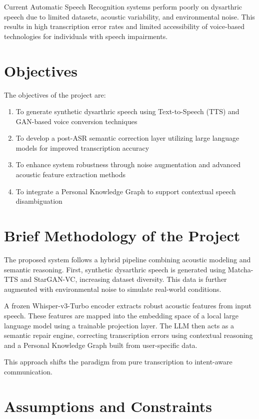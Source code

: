 Current Automatic Speech Recognition systems perform poorly on dysarthric speech due to limited datasets, acoustic variability, and environmental noise. This results in high transcription error rates and limited accessibility of voice-based technologies for individuals with speech impairments.

\section{\textbf{Objectives}}

The objectives of the project are:
\begin{enumerate}
\item To generate synthetic dysarthric speech using Text-to-Speech (TTS) and GAN-based voice conversion techniques
\item To develop a post-ASR semantic correction layer utilizing large language models for improved transcription accuracy
\item To enhance system robustness through noise augmentation and advanced acoustic feature extraction methods
\item To integrate a Personal Knowledge Graph to support contextual speech disambiguation
\end{enumerate}

\section{\textbf{Brief Methodology of the Project}}

The proposed system follows a hybrid pipeline combining acoustic modeling and semantic reasoning. First, synthetic dysarthric speech is generated using Matcha-TTS and StarGAN-VC, increasing dataset diversity. This data is further augmented with environmental noise to simulate real-world conditions.

A frozen Whisper-v3-Turbo encoder extracts robust acoustic features from input speech. These features are mapped into the embedding space of a local large language model using a trainable projection layer. The LLM then acts as a semantic repair engine, correcting transcription errors using contextual reasoning and a Personal Knowledge Graph built from user-specific data.

This approach shifts the paradigm from pure transcription to intent-aware communication.

\section{\textbf{Assumptions and Constraints}}

